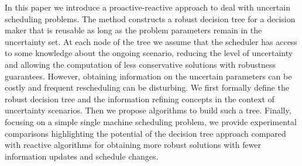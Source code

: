 
In this paper we introduce a proactive-reactive approach to deal with uncertain scheduling problems. The method constructs a robust decision tree for a decision maker  that is reusable as long as the problem parameters remain in the uncertainty set. At each node of the tree we assume that the scheduler has access to some knowledge about the ongoing scenario, reducing the level of uncertainty and allowing the computation of less conservative solutions with robustness guarantees. However, obtaining information on the uncertain parameters can be costly and frequent rescheduling can be disturbing. 
We first formally define the robust decision tree and the information refining concepts in the context of uncertainty scenarios. Then we propose algorithms to build such a tree. Finally, focusing on a simple single machine scheduling problem, we provide experimental comparisons highlighting the potential of the decision tree approach compared with reactive algorithms for obtaining more robust solutions with fewer information updates and schedule changes.

